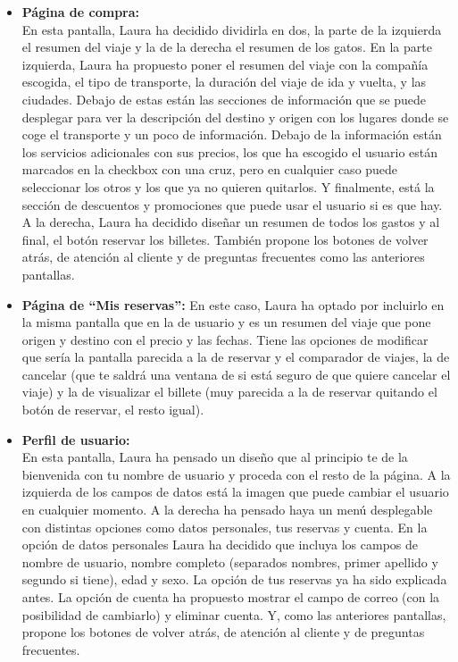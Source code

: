 \begin{itemize}
    \item\textbf{Página de compra:} \\ En esta pantalla, Laura ha decidido dividirla en dos, la parte de la izquierda el resumen del viaje y la de la derecha el resumen de los gatos.
    En la parte izquierda, Laura ha propuesto poner el resumen del viaje con la compañía escogida, el tipo de transporte, la duración del viaje de ida y vuelta, y las ciudades. Debajo de estas están las secciones de información que se puede desplegar para ver la descripción del destino y origen con los lugares donde se coge el transporte y un poco de información. Debajo de la información están los servicios adicionales con sus precios, los que ha escogido el usuario están marcados en la checkbox con una cruz, pero en cualquier caso puede seleccionar los otros y los que ya no quieren quitarlos. Y finalmente, está la sección de descuentos y promociones que puede usar el usuario si es que hay.
    A la derecha, Laura ha decidido diseñar un resumen de todos los gastos y al final, el botón reservar los billetes.
    También propone los botones de volver atrás, de atención al cliente y de preguntas frecuentes como las anteriores pantallas.
    \item\textbf{Página de ``Mis reservas'':} En este caso, Laura ha optado por incluirlo en la misma pantalla que en la de usuario y es un resumen del viaje que pone origen y destino con el precio y las fechas. Tiene las opciones de modificar que sería la pantalla parecida a la de reservar y el comparador de viajes, la de cancelar (que te saldrá una ventana de si está seguro de que quiere cancelar el viaje) y la de visualizar el billete (muy parecida a la de reservar quitando el botón de reservar, el resto igual).
    \item\textbf{Perfil de usuario:} \\ En esta pantalla, Laura ha pensado un diseño que al principio te de la bienvenida con tu nombre de usuario y proceda con el resto de la página.
    A la izquierda de los campos de datos está la imagen que puede cambiar el usuario en cualquier momento.
    A la derecha ha pensado haya un menú desplegable con distintas opciones como datos personales, tus reservas y cuenta. 
    En la opción de datos personales Laura ha decidido que incluya los campos de nombre de usuario, nombre completo (separados nombres, primer apellido y segundo si tiene), edad y sexo.
    La opción de tus reservas ya ha sido explicada antes.
    La opción de cuenta ha propuesto mostrar el campo de correo (con la posibilidad de cambiarlo) y eliminar cuenta.
    Y, como las anteriores pantallas, propone los botones de volver atrás, de atención al cliente y de preguntas frecuentes.
    
\end{itemize}

